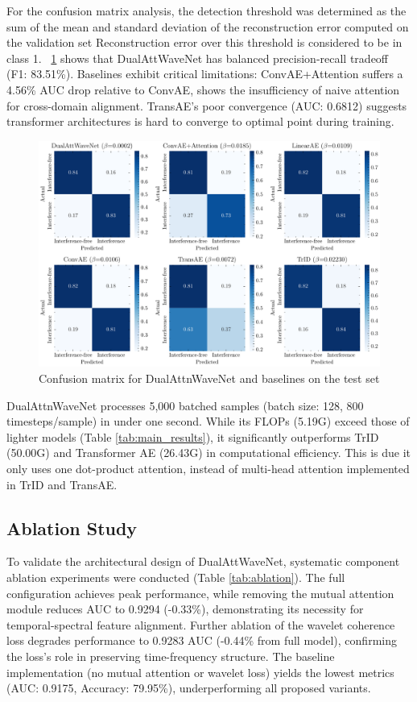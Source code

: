 \documentclass[conference]{IEEEtran}
\begin{document}
For the confusion matrix analysis, the detection threshold was determined as the sum of the mean and standard deviation of the reconstruction error computed on the validation set  Reconstruction error over this threshold is considered to be in class 1. \figurename~\ref{fig:confusion_matrix} shows that DualAttWaveNet has balanced precision-recall tradeoff (F1: 83.51\%). Baselines exhibit critical limitations: ConvAE+Attention suffers a 4.56\% AUC drop relative to ConvAE, shows  the insufficiency of naive attention for cross-domain alignment. TransAE’s poor convergence (AUC: 0.6812) suggests transformer architectures is hard to converge to optimal point during training.


\begin{figure}[tb]
    \centering
    \includegraphics[width=\linewidth]{confusion.pdf}
    \caption{Confusion matrix for DualAttnWaveNet and baselines on the test set}
    \label{fig:confusion_matrix}
\end{figure}

DualAttnWaveNet processes 5,000 batched samples (batch size: 128, 800 timesteps/sample) in under one second. While its FLOPs (5.19G) exceed those of lighter models (Table \ref{tab:main_results}), it significantly outperforms TrID (50.00G) and Transformer AE (26.43G) in computational efficiency. This is due it only uses one dot-product attention, instead of multi-head attention implemented in TrID and TransAE.


\subsection{Ablation Study}

To validate the architectural design of DualAttWaveNet, systematic component ablation experiments were conducted (Table \ref{tab:ablation}). The full configuration achieves peak performance, while removing the mutual attention module reduces AUC to 0.9294 (-0.33\%), demonstrating its necessity for temporal-spectral feature alignment. Further ablation of the wavelet coherence loss degrades performance to 0.9283 AUC (-0.44\% from full model), confirming the loss’s role in preserving time-frequency structure. The baseline implementation (no mutual attention or wavelet loss) yields the lowest metrics (AUC: 0.9175, Accuracy: 79.95\%), underperforming all proposed variants.
\end{document}
